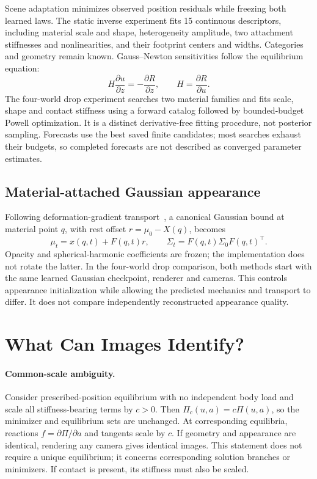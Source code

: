 \documentclass[10pt,twocolumn,letterpaper]{article}
\begin{document}
Scene adaptation minimizes observed position residuals while freezing both learned laws. The static inverse experiment fits 15 continuous descriptors, including material scale and shape, heterogeneity amplitude, two attachment stiffnesses and nonlinearities, and their footprint centers and widths. Categories and geometry remain known. Gauss--Newton sensitivities follow the equilibrium equation:
\begin{equation}
 H\frac{\partial u}{\partial z}=-\frac{\partial R}{\partial z},\qquad H=\frac{\partial R}{\partial u}.
\end{equation}
The four-world drop experiment searches two material families and fits scale, shape and contact stiffness using a forward catalog followed by bounded-budget Powell optimization. It is a distinct derivative-free fitting procedure, not posterior sampling. Forecasts use the best saved finite candidates; most searches exhaust their budgets, so completed forecasts are not described as converged parameter estimates.

\subsection{Material-attached Gaussian appearance}
Following deformation-gradient transport~\cite{xie2024physgaussian}, a canonical Gaussian bound at material point $q$, with rest offset $r=\mu_0-X(q)$, becomes
\begin{equation}
 \mu_t=x(q,t)+F(q,t)r,\qquad \Sigma_t=F(q,t)\Sigma_0F(q,t)^\top.
\end{equation}
Opacity and spherical-harmonic coefficients are frozen; the implementation does not rotate the latter. In the four-world drop comparison, both methods start with the same learned Gaussian checkpoint, renderer and cameras. This controls appearance initialization while allowing the predicted mechanics and transport to differ. It does not compare independently reconstructed appearance quality.

\section{What Can Images Identify?}
\paragraph{Common-scale ambiguity.}
Consider prescribed-position equilibrium with no independent body load and scale all stiffness-bearing terms by $c>0$. Then $\Pi_c(u,a)=c\Pi(u,a)$, so the minimizer and equilibrium sets are unchanged. At corresponding equilibria, reactions $f=\partial\Pi/\partial a$ and tangents scale by $c$. If geometry and appearance are identical, rendering any camera gives identical images. This statement does not require a unique equilibrium; it concerns corresponding solution branches or minimizers. If contact is present, its stiffness must also be scaled.
\end{document}
